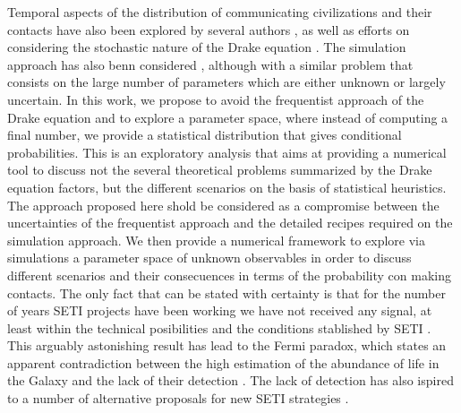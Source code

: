 \documentclass[crop]{CSLB}
\begin{document}
\Fpagebreak


Temporal aspects of the distribution of communicating civilizations
and their contacts have also been explored by several authors
\citep{fogg_temporal_1987, forgan_spatiotemporal_2011,
balbi_impact_2018, balb_spatiotemporal_2018, horvat_impact_2011},
%
as well as efforts on considering the stochastic nature of the Drake equation
\citep{glade_stochastic_2011}.
%
The simulation approach has also benn considered
\citep{forgan_evaluating_2015, vukotic_grandeur_2016,
murante_simulating_2015, forgan_numerical_2009, forgan_galactic_2017},
although with a similar problem that consists on the large number of
parameters which are either unknown or largely uncertain.
%
%
%
In this work, we propose to
avoid the frequentist approach of the Drake equation and to explore a
parameter space, where instead of computing a final number, we provide
a statistical distribution that gives conditional probabilities.
%
This is an exploratory analysis that aims at providing a numerical 
tool to discuss not the several theoretical problems summarized by the
Drake equation factors, 
but the different scenarios on the basis of statistical heuristics.
%
The approach proposed here shold be considered as a compromise between
the uncertainties of the frequentist approach and the detailed recipes
required on the simulation approach.
%
We then provide a numerical framework to explore via simulations a
parameter space of unknown observables in order to discuss different
scenarios and their consecuences in terms of the probability con
making contacts.
%
The only fact that can be stated with certainty is that for the number
of years SETI projects have been working we have not received any
signal, at least
within the technical posibilities and the 
conditions stablished by SETI \citep{tarter_search_2001}.
%
This arguably astonishing result has lead to the Fermi paradox, which
states an apparent contradiction between the high estimation of the
abundance of life in the Galaxy and the lack of their detection
\citep{vanhouten_isthere_2017}.
%
The lack of detection has also ispired to a number of alternative proposals
for new SETI strategies \citep{forgan_exoplanet_2017,
balbi_impact_2018, loeb_eavesdropping_2006, maccone_KLT_2010,
tarter_advancing_2009, enriquez_breakthrough_2017, loeb_relative_2016,
maccone_SETI_2011,  lingam_relative_2019, wright_theGsearch_2015,
maccone_SETI_2013, maccone_lognormals_2014, harp_application_2018,
forgan_possibility_2013, forgan_galactic_2017, funes_searching_2019}.
 
\end{document}
